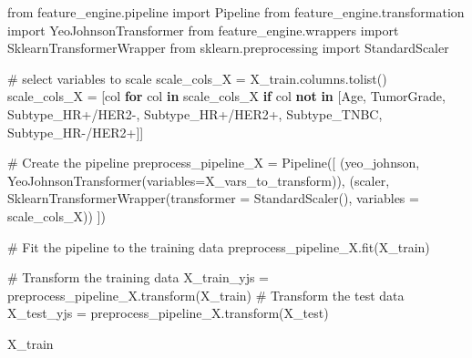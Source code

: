 \documentclass[
  letterpaper,
  DIV=11,
  numbers=noendperiod]{scrartcl}
\newenvironment{Shaded}{\begin{snugshade}}{\end{snugshade}}
\newcommand{\CommentTok}[1]{\textcolor[rgb]{0.37,0.37,0.37}{#1}}
\newcommand{\ControlFlowTok}[1]{\textcolor[rgb]{0.00,0.23,0.31}{\textbf{#1}}}
\newcommand{\ImportTok}[1]{\textcolor[rgb]{0.00,0.46,0.62}{#1}}
\newcommand{\KeywordTok}[1]{\textcolor[rgb]{0.00,0.23,0.31}{\textbf{#1}}}
\newcommand{\NormalTok}[1]{\textcolor[rgb]{0.00,0.23,0.31}{#1}}
\newcommand{\OperatorTok}[1]{\textcolor[rgb]{0.37,0.37,0.37}{#1}}
\newcommand{\StringTok}[1]{\textcolor[rgb]{0.13,0.47,0.30}{#1}}
\begin{document}
\begin{Shaded}
\begin{Highlighting}[]
\ImportTok{from}\NormalTok{ feature\_engine.pipeline }\ImportTok{import}\NormalTok{ Pipeline}
\ImportTok{from}\NormalTok{ feature\_engine.transformation }\ImportTok{import}\NormalTok{ YeoJohnsonTransformer}
\ImportTok{from}\NormalTok{ feature\_engine.wrappers }\ImportTok{import}\NormalTok{ SklearnTransformerWrapper}
\ImportTok{from}\NormalTok{ sklearn.preprocessing }\ImportTok{import}\NormalTok{ StandardScaler}

\CommentTok{\# select variables to scale}
\NormalTok{scale\_cols\_X }\OperatorTok{=}\NormalTok{ X\_train.columns.tolist()}
\NormalTok{scale\_cols\_X }\OperatorTok{=}\NormalTok{ [col }\ControlFlowTok{for}\NormalTok{ col }\KeywordTok{in}\NormalTok{ scale\_cols\_X }\ControlFlowTok{if}\NormalTok{ col }\KeywordTok{not} \KeywordTok{in}\NormalTok{ [}\StringTok{\textquotesingle{}Age\textquotesingle{}}\NormalTok{, }\StringTok{\textquotesingle{}TumorGrade\textquotesingle{}}\NormalTok{, }\StringTok{\textquotesingle{}Subtype\_HR+/HER2{-}\textquotesingle{}}\NormalTok{, }\StringTok{\textquotesingle{}Subtype\_HR+/HER2+\textquotesingle{}}\NormalTok{, }\StringTok{\textquotesingle{}Subtype\_TNBC\textquotesingle{}}\NormalTok{, }\StringTok{\textquotesingle{}Subtype\_HR{-}/HER2+\textquotesingle{}}\NormalTok{]]}

\CommentTok{\# Create the pipeline}
\NormalTok{preprocess\_pipeline\_X }\OperatorTok{=}\NormalTok{ Pipeline([}
\NormalTok{    (}\StringTok{\textquotesingle{}yeo\_johnson\textquotesingle{}}\NormalTok{, YeoJohnsonTransformer(variables}\OperatorTok{=}\NormalTok{X\_vars\_to\_transform)),}
\NormalTok{    (}\StringTok{\textquotesingle{}scaler\textquotesingle{}}\NormalTok{, SklearnTransformerWrapper(transformer }\OperatorTok{=}\NormalTok{ StandardScaler(), variables }\OperatorTok{=}\NormalTok{ scale\_cols\_X))}
\NormalTok{])}

\CommentTok{\# Fit the pipeline to the training data}
\NormalTok{preprocess\_pipeline\_X.fit(X\_train)}

\CommentTok{\# Transform the training data}
\NormalTok{X\_train\_yjs }\OperatorTok{=}\NormalTok{ preprocess\_pipeline\_X.transform(X\_train)}
\CommentTok{\# Transform the test data}
\NormalTok{X\_test\_yjs }\OperatorTok{=}\NormalTok{ preprocess\_pipeline\_X.transform(X\_test)}
\end{Highlighting}
\end{Shaded}

\begin{Shaded}
\begin{Highlighting}[]
\NormalTok{X\_train}
\end{Highlighting}
\end{Shaded}
\end{document}

